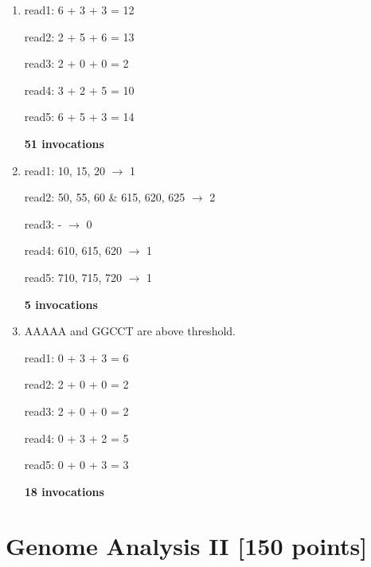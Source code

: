 \documentclass[a4paper]{article}
\begin{document}
\begin{enumerate}[label=\alph*)]
    \item read1: 6 + 3 + 3 = 12
          
          read2: 2 + 5 + 6 = 13

          read3: 2 + 0 + 0 = 2

          read4: 3 + 2 + 5 = 10

          read5: 6 + 5 + 3 = 14

          \textbf{51 invocations}
    
      \item read1: 10, 15, 20 $\rightarrow$ 1
           
            read2: 50, 55, 60 \& 615, 620, 625 $\rightarrow$ 2

            read3: - $\rightarrow$ 0

            read4: 610, 615, 620 $\rightarrow$ 1

            read5: 710, 715, 720 $\rightarrow$ 1

            \textbf{5 invocations}

    \item AAAAA and GGCCT are above threshold.

          read1: 0 + 3 + 3 = 6
          
          read2: 2 + 0 + 0 = 2

          read3: 2 + 0 + 0 = 2

          read4: 0 + 3 + 2 = 5
          
          read5: 0 + 0 + 3 = 3

          \textbf{18 invocations}
\end{enumerate}

\section{Genome Analysis II [150 points]}
\end{document}

